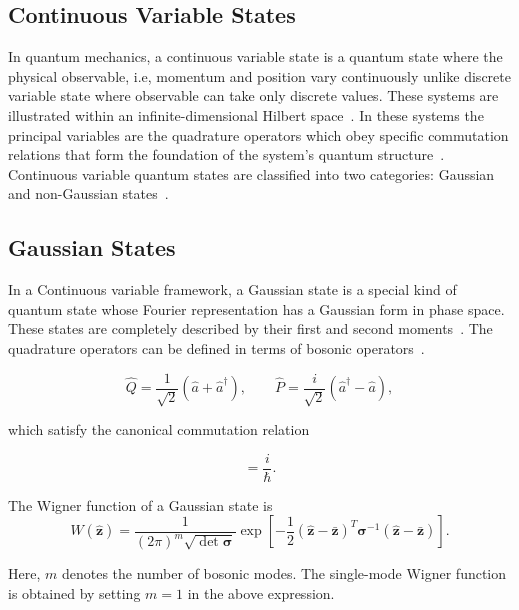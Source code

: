 \subsection{Continuous Variable States}
In quantum mechanics, a continuous variable state is a quantum state where the physical observable, i.e, momentum and position vary continuously unlike discrete variable state where observable can take only discrete values. These systems are illustrated within an infinite-dimensional Hilbert space~\cite{BraunsteinVanLoock2005}. In these systems the principal variables are the quadrature operators which obey specific commutation relations that form the foundation of the system's quantum structure~\cite{Serafini2017}.
Continuous variable quantum states are classified into two categories: Gaussian and non-Gaussian states~\cite{AdessoRagyLee2014}.

\subsection{Gaussian States}
In a Continuous variable framework, a Gaussian state is a special kind of quantum state whose Fourier representation has a Gaussian form in phase space. These states are completely described by their first and second moments~\cite{Weedbrook2012}.
The quadrature operators can be defined in terms of bosonic operators~\cite{WallsMilburn}.

\begin{equation}
	\hat{Q} = \frac{1}{\sqrt{2}}(\hat{a} + \hat{a}^\dagger), 
	\qquad 
	\hat{P} = \frac{i}{\sqrt{2}}(\hat{a}^\dagger - \hat{a}),
\end{equation}


which satisfy the canonical commutation relation

\begin{equation}
	[\hat{Q},\hat{P}] = \frac{i}{\hbar}.
\end{equation}

The Wigner function of a Gaussian state is
\begin{equation}
	W(\hat{\mathbf{z}}) =
	\frac{1}{(2\pi)^{m}\sqrt{\det\boldsymbol{\sigma}}}
	\exp\!\left[
	-\frac{1}{2}
	(\hat{\mathbf{z}}-\bar{\mathbf{z}})^{T}
	\boldsymbol{\sigma}^{-1}
	(\hat{\mathbf{z}}-\bar{\mathbf{z}})
	\right].
\end{equation}

Here, $m$ denotes the number of bosonic modes. The single-mode Wigner function is obtained by setting $m=1$ in the above expression\cite{Serafini2017,Weedbrook2012}.

